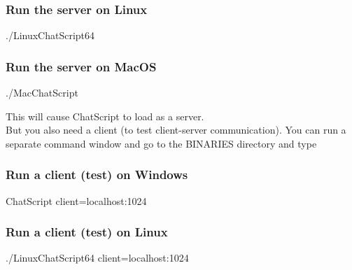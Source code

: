 \documentclass[]{article}
\newenvironment{Shaded}{}{}
\newcommand{\ExtensionTok}[1]{#1}
\newcommand{\NormalTok}[1]{#1}
\begin{document}
\subsubsection{Run the server on Linux}\label{run-the-server-on-linux}

\begin{Shaded}
\begin{Highlighting}[]
\ExtensionTok{./LinuxChatScript64}
\end{Highlighting}
\end{Shaded}

\subsubsection{Run the server on MacOS}\label{run-the-server-on-macos}

\begin{Shaded}
\begin{Highlighting}[]
\ExtensionTok{./MacChatScript}
\end{Highlighting}
\end{Shaded}

This will cause ChatScript to load as a server.\\
But you also need a client (to test client-server communication). You
can run a separate command window and go to the BINARIES directory and
type

\subsubsection{Run a client (test) on
Windows}\label{run-a-client-test-on-windows}

\begin{Shaded}
\begin{Highlighting}[]
\ExtensionTok{ChatScript}\NormalTok{ client=localhost:1024 }
\end{Highlighting}
\end{Shaded}

\subsubsection{Run a client (test) on
Linux}\label{run-a-client-test-on-linux}

\begin{Shaded}
\begin{Highlighting}[]
\ExtensionTok{./LinuxChatScript64}\NormalTok{ client=localhost:1024}
\end{Highlighting}
\end{Shaded}
\end{document}
